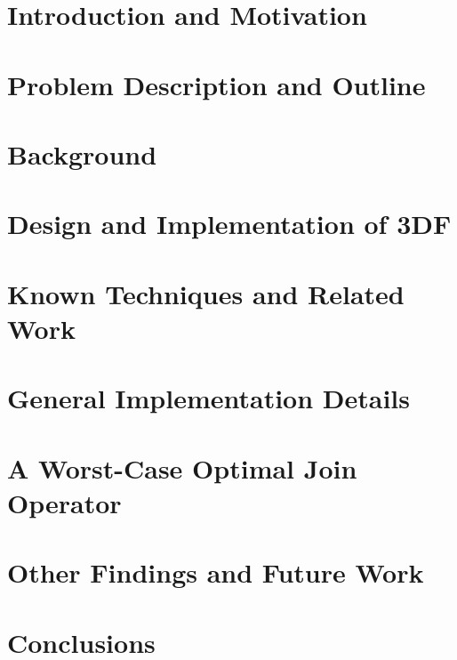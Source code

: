 \documentclass{article}
\begin{document}
\newpage

\section{Introduction and Motivation} \label{intro}

\newpage

\section{Problem Description and Outline} \label{problem}

\newpage

\section{Background} \label{background}

\newpage

\section{Design and Implementation of 3DF} \label{3df}

\newpage

\section{Known Techniques and Related Work} \label{known-techniques}

\newpage



\section{General Implementation Details} \label{implementation}

\newpage

\section{A Worst-Case Optimal Join Operator} \label{impl-hector}

\newpage

\section{Other Findings and Future Work} \label{future-work}

\newpage

\section{Conclusions} \label{conclusions}
\end{document}
